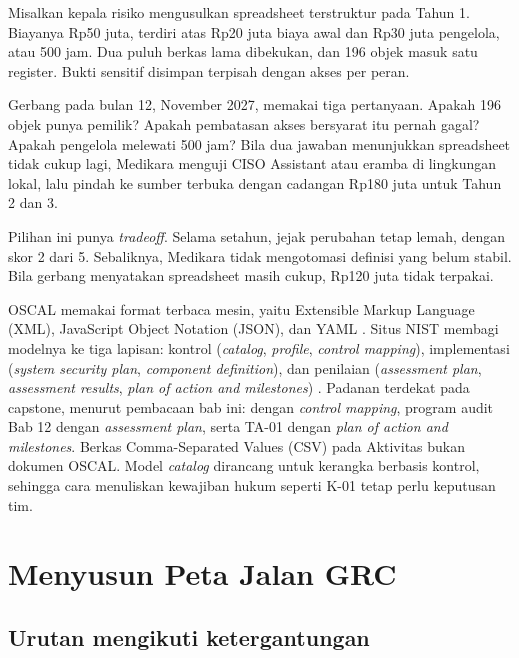 \begin{kasus}[title={Kasus Medikara Health: Alat Dipilih Bertahap}]
Misalkan kepala risiko mengusulkan spreadsheet terstruktur pada Tahun 1. Biayanya Rp50 juta,
terdiri atas Rp20 juta biaya awal dan Rp30 juta pengelola, atau 500 jam. Dua puluh berkas lama
dibekukan, dan 196 objek masuk satu register. Bukti sensitif disimpan terpisah dengan akses per
peran.

Gerbang pada bulan 12, November 2027, memakai tiga pertanyaan. Apakah 196 objek punya pemilik?
Apakah pembatasan akses bersyarat itu pernah gagal? Apakah pengelola melewati 500 jam? Bila dua
jawaban menunjukkan spreadsheet tidak cukup lagi, Medikara menguji CISO Assistant atau eramba di
lingkungan lokal, lalu pindah ke sumber terbuka dengan cadangan Rp180 juta untuk Tahun 2 dan 3.

Pilihan ini punya \textit{tradeoff}. Selama setahun, jejak perubahan tetap lemah, dengan skor 2
dari 5. Sebaliknya, Medikara tidak mengotomasi definisi yang belum stabil. Bila gerbang menyatakan
spreadsheet masih cukup, Rp120 juta tidak terpakai.
\end{kasus}

\begin{pendalaman}
OSCAL memakai format terbaca mesin, yaitu Extensible Markup Language (XML), JavaScript Object
Notation (JSON), dan YAML \cite{c14-oscal}. Situs NIST membagi modelnya ke tiga lapisan: kontrol
(\textit{catalog}, \textit{profile}, \textit{control mapping}), implementasi (\textit{system
security plan}, \textit{component definition}), dan penilaian (\textit{assessment plan},
\textit{assessment results}, \textit{plan of action and milestones}) \cite{c14-oscal-layers}.
Padanan terdekat pada capstone, menurut pembacaan bab ini:
 dengan \textit{control mapping}, program audit Bab
12 dengan \textit{assessment plan}, serta TA-01 dengan \textit{plan of action and milestones}.
Berkas Comma-Separated Values (CSV) pada Aktivitas bukan dokumen OSCAL. Model \textit{catalog}
dirancang untuk kerangka berbasis kontrol, sehingga cara menuliskan kewajiban hukum seperti K-01
tetap perlu keputusan tim.
\end{pendalaman}

\section{Menyusun Peta Jalan GRC}

\subsection*{Urutan mengikuti ketergantungan}

